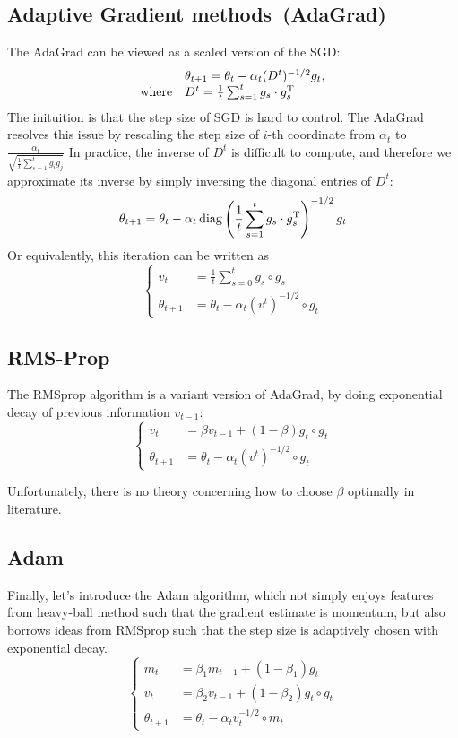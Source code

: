 \subsection{Adaptive Gradient methods~(AdaGrad)~\citep{Duchi2001}}
The AdaGrad can be viewed as a scaled version of the SGD:
\[
\begin{array}{ll}
&\theta_{t+1} = \theta_t - \alpha_t(D^t)^{-1/2}g_t,\\
\text{where}&D^t = \frac{1}{t}\sum_{s=1}^tg_s\cdot g_s^{\mathrm T}
\end{array}
\]
The inituition is that the step size of SGD is hard to control. 
The AdaGrad resolves this issue by rescaling the step size of $i$-th coordinate
from $\alpha_t$ to $\frac{\alpha_t}{\sqrt{\frac{1}{t}\sum_{s=1}^tg_ig_j}}$
In practice, the inverse of $D^t$ is difficult to compute, and therefore we approximate its inverse by simply inversing the diagonal entries of $D^t$:
\[
\theta_{t+1} = \theta_t - \alpha_t \operatorname{diag}\left(
\frac{1}{t}\sum_{s=1}^tg_s\cdot g_s^{\mathrm T}
\right)^{-1/2}g_t
\]
Or equivalently, this iteration can be written as
\[
\left\{
\begin{aligned}
v_t &= \frac{1}{t}\sum_{s=0}^tg_s\circ g_s\\
\theta_{t+1} &=  \theta_t - \alpha_t (v^t)^{-1/2}\circ g_t
\end{aligned}
\right.
\]

\subsection{RMS-Prop~\citep{RMSProp}}
The RMSprop algorithm is a variant version of AdaGrad, by doing exponential decay of previous information $v_{t-1}$:
\[
\left\{
\begin{aligned}
v_t &=\beta v_{t-1} + (1-\beta)g_t\circ g_t\\
\theta_{t+1} &=  \theta_t - \alpha_t (v^t)^{-1/2}\circ g_t
\end{aligned}
\right.
\]
\begin{remark}
Unfortunately, there is no theory concerning how to choose $\beta$ optimally in literature.
\end{remark}

\subsection{Adam~\citep{kingma-adam}}
Finally, let's introduce the Adam algorithm, which not simply enjoys features from heavy-ball method such that the gradient estimate is momentum, but also borrows ideas from RMSprop such that the step size is adaptively chosen with exponential decay.
\[
\left\{
\begin{aligned}
m_t&=\beta_1 m_{t-1} + (1-\beta_1)g_t\\
v_t&=\beta_2v_{t-1} + (1-\beta_2)g_t\circ g_t\\
\theta_{t+1}&=\theta_t - \alpha_tv_t^{-1/2}\circ m_t
\end{aligned}
\right.
\]
